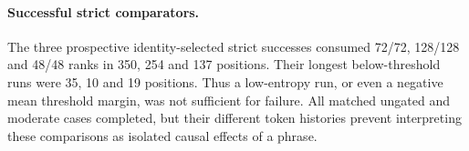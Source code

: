 \paragraph{Successful strict comparators.}

The three prospective identity-selected strict successes consumed 72/72, 128/128 and 48/48 ranks in 350, 254 and 137 positions. Their longest below-threshold runs were 35, 10 and 19 positions. Thus a low-entropy run, or even a negative mean threshold margin, was not sufficient for failure. All matched ungated and moderate cases completed, but their different token histories prevent interpreting these comparisons as isolated causal effects of a phrase.
